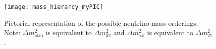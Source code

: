 \begin{figure}[]
\centering
\texttt{[image: mass\_hierarcy\_myPIC]}
\caption[Mass Ordering]{Pictorial representation of the possible neutrino mass orderings. Note: $\Delta m^2_\text{atm}$ is equivalent to $\Delta m^2_{32}$ and $\Delta m^2_\text{sol}$ is equivalent to $\Delta m^2_{21}$.}
\label{fig:hierarchy}
\end{figure}









